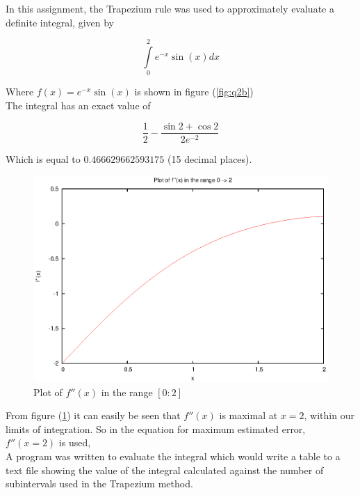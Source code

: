 \documentclass[pdf,color]{UoBnote}
\begin{document}
				In this assignment, the Trapezium rule was used to approximately evaluate a definite integral, given by
				
				\begin{equation}
				\int\limits_0^2 e^{-x}\sin{(x)} dx	
				\end{equation}

				Where $f(x) = e^{-x}\sin{(x)}$ is shown in figure (\ref{fig:q2b})\\				
								
				The integral has an exact value of
				
				\begin{equation}
				\frac{1}{2} - \frac{\sin{2}+\cos{2}}{2e^{-2}}
				\end{equation}
				
				Which is equal to $0.466629662593175$ (15 decimal places).\\							
				\begin{figure}[H]
					\centering
						\includegraphics{figures/q2-f2x-trap.eps}
					\caption{Plot of $f''(x)$ in the range $[0:2]$}
					\label{fig:q2-f2x-trap}
				\end{figure}
				
				From figure (\ref{fig:q2-f2x-trap}) it can easily be seen that $f''(x)$ is maximal at $x=2$, within our limits of integration. So in the equation for maximum estimated error, $f''(x=2)$ is used,\\				
				
				A program was written to evaluate the integral which would write a table to a text file showing the value of the integral calculated against the number of subintervals used in the Trapezium method.
				
\end{document}
